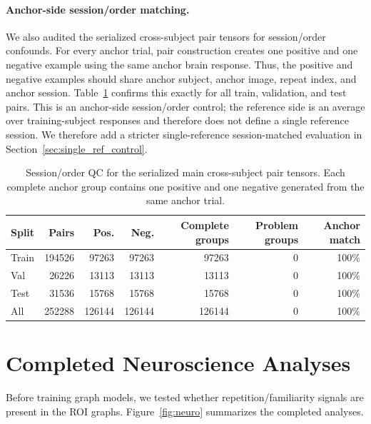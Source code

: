 \documentclass{article}
\begin{document}
\paragraph{Anchor-side session/order matching.}
We also audited the serialized cross-subject pair tensors for session/order confounds. For every anchor trial, pair construction creates one positive and one negative example using the same anchor brain response. Thus, the positive and negative examples should share anchor subject, anchor image, repeat index, and anchor session. Table~\ref{tab:session_order_pair_qc} confirms this exactly for all train, validation, and test pairs. This is an anchor-side session/order control; the reference side is an average over training-subject responses and therefore does not define a single reference session. We therefore add a stricter single-reference session-matched evaluation in Section~\ref{sec:single_ref_control}.

\begin{table}[!htbp]
  \centering
  \caption{Session/order QC for the serialized main cross-subject pair tensors. Each complete anchor group contains one positive and one negative generated from the same anchor trial.}
  \label{tab:session_order_pair_qc}
  \scriptsize
  \setlength{\tabcolsep}{4pt}
  \renewcommand{\arraystretch}{1.15}
  \begin{tabular}{lrrrrrr}
    \toprule
    Split & Pairs & Pos. & Neg. & Complete groups & Problem groups & Anchor match \\
    \midrule
    Train & 194526 & 97263 & 97263 & 97263 & 0 & 100\% \\
    Val & 26226 & 13113 & 13113 & 13113 & 0 & 100\% \\
    Test & 31536 & 15768 & 15768 & 15768 & 0 & 100\% \\
    All & 252288 & 126144 & 126144 & 126144 & 0 & 100\% \\
    \bottomrule
  \end{tabular}
\end{table}

\section{Completed Neuroscience Analyses}

Before training graph models, we tested whether repetition/familiarity signals are present in the ROI graphs. Figure~\ref{fig:neuro} summarizes the completed analyses.
\end{document}

